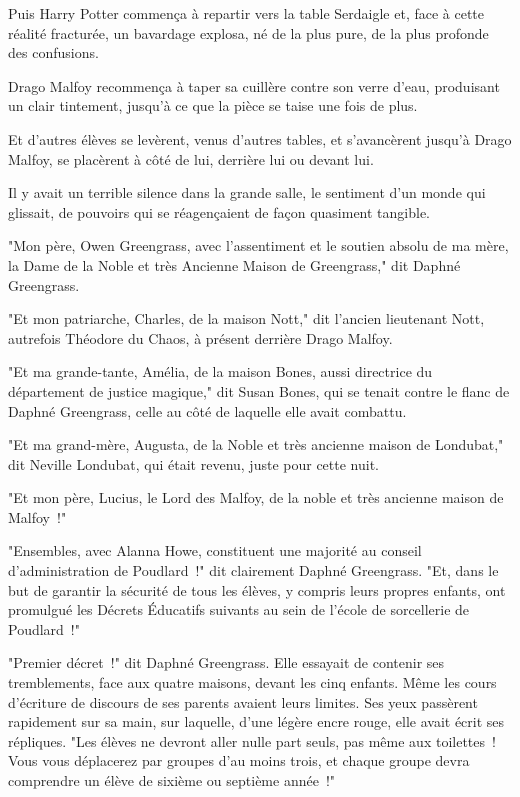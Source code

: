 Puis Harry Potter commença à repartir vers la table Serdaigle et, face à cette réalité fracturée, un bavardage explosa, né de la plus pure, de la plus profonde des confusions.

Drago Malfoy recommença à taper sa cuillère contre son verre d'eau, produisant un clair tintement, jusqu'à ce que la pièce se taise une fois de plus.

Et d'autres élèves se levèrent, venus d'autres tables, et s'avancèrent jusqu'à Drago Malfoy, se placèrent à côté de lui, derrière lui ou devant lui.

Il y avait un terrible silence dans la grande salle, le sentiment d'un monde qui glissait, de pouvoirs qui se réagençaient de façon quasiment tangible.

"Mon père, Owen Greengrass, avec l'assentiment et le soutien absolu de ma mère, la Dame de la Noble et très Ancienne Maison de Greengrass," dit Daphné Greengrass.

"Et mon patriarche, Charles, de la maison Nott," dit l'ancien lieutenant Nott, autrefois Théodore du Chaos, à présent derrière Drago Malfoy.

"Et ma grande-tante, Amélia, de la maison Bones, aussi directrice du département de justice magique," dit Susan Bones, qui se tenait contre le flanc de Daphné Greengrass, celle au côté de laquelle elle avait combattu.

"Et ma grand-mère, Augusta, de la Noble et très ancienne maison de Londubat," dit Neville Londubat, qui était revenu, juste pour cette nuit.

"Et mon père, Lucius, le Lord des Malfoy, de la noble et très ancienne maison de Malfoy~!"

"Ensembles, avec Alanna Howe, constituent une majorité au conseil d'administration de Poudlard~!" dit clairement Daphné Greengrass. "Et, dans le but de garantir la sécurité de tous les élèves, y compris leurs propres enfants, ont promulgué les Décrets Éducatifs suivants au sein de l'école de sorcellerie de Poudlard~!"

\later

"Premier décret~!" dit Daphné Greengrass. Elle essayait de contenir ses tremblements, face aux quatre maisons, devant les cinq enfants. Même les cours d'écriture de discours de ses parents avaient leurs limites. Ses yeux passèrent rapidement sur sa main, sur laquelle, d'une légère encre rouge, elle avait écrit ses répliques. "Les élèves ne devront aller nulle part seuls, pas même aux toilettes~! Vous vous déplacerez par groupes d'au moins trois, et chaque groupe devra comprendre un élève de sixième ou septième année~!"

